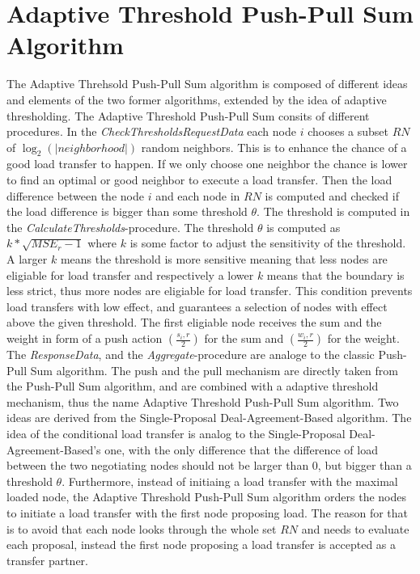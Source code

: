 \section{Adaptive Threshold Push-Pull Sum Algorithm}\label{sec:adaptivethresholdPPS}
The Adaptive Threhsold Push-Pull Sum algorithm is composed of different ideas and elements of the two former algorithms, extended by the idea of adaptive thresholding. The Adaptive Threshold Push-Pull Sum consits of different procedures. In the \textit{CheckThresholdsRequestData} each node $i$ chooses a subset $RN$ of $\log_{2}{(|neighborhood|)}$ random neighbors. This is to enhance the chance of a good load transfer to happen. If we only choose one neighbor the chance is lower to find an optimal or good neighbor to execute a load transfer. Then the load difference between the node $i$ and each node in $RN$ is computed and checked if the load difference is bigger than some threshold $\theta$. The threshold is computed in the \textit{CalculateThresholds}-procedure. The threshold $\theta$ is computed as $k*\sqrt{MSE_r-1}$ where $k$ is some factor to adjust the sensitivity of the threshold. A larger $k$ means the threshold is more sensitive meaning that less nodes are eligiable for load transfer and respectively a lower $k$ means that the boundary is less strict, thus more nodes are eligiable for load transfer. This condition prevents load transfers with low effect, and guarantees a selection of nodes with effect above the given threshold. The first eligiable node receives the sum and the weight in form of a push action $(\frac{s_i,r}{2})$ for the sum and $(\frac{w_i,r}{2})$ for the weight. The \textit{ResponseData}, and the \textit{Aggregate}-procedure are analoge to the classic Push-Pull Sum algorithm. The push and the pull mechanism are directly taken from the Push-Pull Sum algorithm, and are combined with a adaptive threshold mechanism, thus the name Adaptive Threshold Push-Pull Sum algorithm. Two ideas are derived from the Single-Proposal Deal-Agreement-Based algorithm. The idea of the conditional load transfer is analog to the Single-Proposal Deal-Agreement-Based's one, with the only difference that the difference of load between the two negotiating nodes should not be larger than 0, but bigger than a threshold $\theta$. Furthermore, instead of initiaing a load transfer with the maximal loaded node, the Adaptive Threshold Push-Pull Sum algorithm orders the nodes to initiate a load transfer with the first node proposing load. The reason for that is to avoid that each node looks through the whole set $RN$ and needs to evaluate each proposal, instead the first node proposing a load transfer is accepted as a transfer partner.

